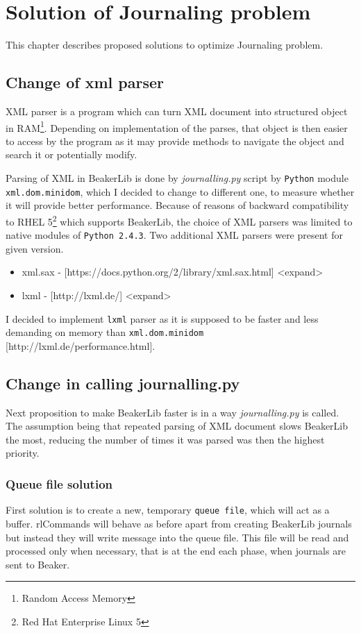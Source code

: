 \chapter{Solution of Journaling problem}
This chapter describes proposed solutions to optimize Journaling problem.

\section{Change of xml parser}
XML parser is a program which can turn XML document into structured object in RAM\footnote{Random Access Memory}. Depending on implementation of the parses, that object is then easier to access by the program as it may provide methods to navigate the object and search it or potentially modify. 

Parsing of XML in BeakerLib is done by \textit{journalling.py} script by \texttt{Python} module \texttt{xml.dom.minidom}, which I decided to change to different one, to measure whether it will provide better performance. Because of reasons of backward compatibility to RHEL 5\footnote{Red Hat Enterprise Linux 5} which supports BeakerLib, the choice of XML parsers was limited to native modules of \texttt{Python 2.4.3}. Two additional XML parsers were present for given version.

\begin{itemize}
\item xml.sax -  [https://docs.python.org/2/library/xml.sax.html] <expand>
\item lxml - [http://lxml.de/] <expand>
\end{itemize}

I decided to implement \texttt{lxml} parser as it is supposed to be faster and less demanding on memory than \texttt{xml.dom.minidom} [http://lxml.de/performance.html].

\section{Change in calling journalling.py}
Next proposition to make BeakerLib faster is in a way \textit{journalling.py} is called. The assumption being that repeated parsing of XML document slows BeakerLib the most, reducing the number of times it was parsed was then the highest priority. 

\subsection{Queue file solution}
First solution is to create a new, temporary \texttt{queue file}, which will act as a buffer. rlCommands will behave as before apart from creating BeakerLib journals but instead they will write message into the queue file. This file will be read and processed only when necessary, that is at the end each phase, when journals are sent to Beaker.

